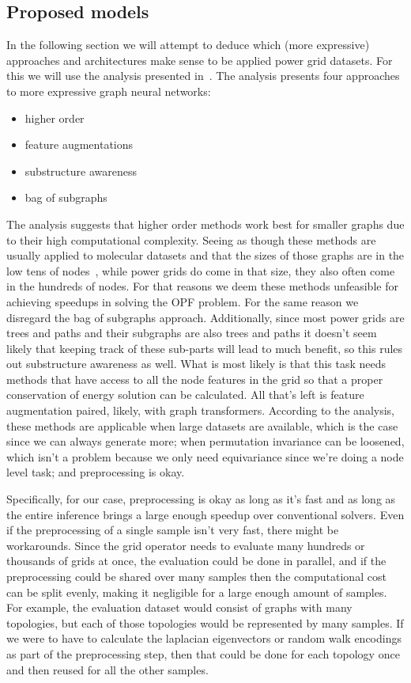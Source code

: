 \subsection*{Proposed models}
In the following section we will attempt to deduce which (more expressive) approaches and architectures
make sense to be applied power grid datasets.
For this we will use the analysis presented in~\cite{expresive2022tutorial}.
The analysis presents four approaches to more expressive graph neural networks:
\begin{itemize}
    \item higher order
    \item feature augmentations
    \item substructure awareness
    \item bag of subgraphs
\end{itemize}

The analysis suggests that higher order methods work best for smaller graphs due to their
high computational complexity.
Seeing as though these methods are usually applied to molecular datasets and that the
sizes of those graphs are in the low tens of nodes~\cite{morris2020tudataset},
while power grids do come in that size, they also often come in the hundreds of nodes.
For that reasons we deem these methods unfeasible for achieving speedups in solving the OPF problem.
For the same reason we disregard the bag of subgraphs approach.
Additionally, since most power grids are trees and paths and their subgraphs are also trees and paths
it doesn't seem likely that keeping track of these sub-parts will lead to much benefit, so this
rules out substructure awareness as well.
What is most likely is that this task needs methods that have access to all the node features in the
grid so that a proper conservation of energy solution can be calculated.
All that's left is feature augmentation paired, likely, with graph transformers.
According to the analysis, these methods are applicable when large datasets are available,
which is the case since we can always generate more; when permutation invariance can be loosened,
which isn't a problem because we only need equivariance since we're doing a node level task; and
preprocessing is okay.

Specifically, for our case, preprocessing is okay as long as it's fast and as long as the
entire inference brings a large enough speedup over conventional solvers.
Even if the preprocessing of a single sample isn't very fast, there might be workarounds.
Since the grid operator needs to evaluate many hundreds or thousands of grids at once, the
evaluation could be done in parallel, and if the preprocessing could be shared over many
samples then the computational cost can be split evenly, making it negligible for a large
enough amount of samples.
For example, the evaluation dataset would consist of graphs with many topologies, but each
of those topologies would be represented by many samples.
If we were to have to calculate the laplacian eigenvectors or random walk encodings as part
of the preprocessing step, then that could be done for each topology once and then reused
for all the other samples.

